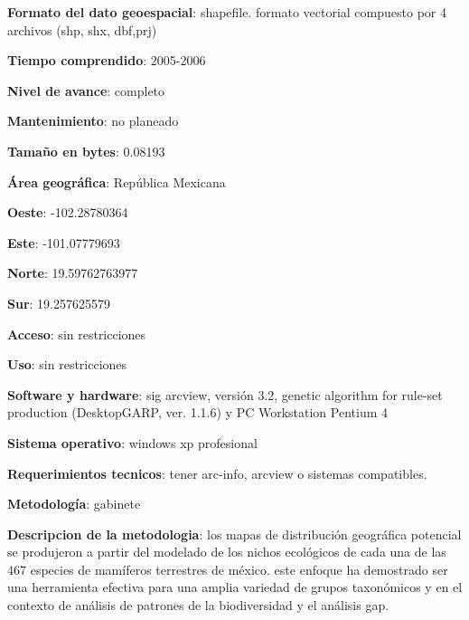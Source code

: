 \documentclass[twoside]{book}
\begin{document}
{\textbf{Formato del dato geoespacial}: shapefile. formato vectorial compuesto por 4 archivos (shp, shx, dbf,prj)

\textbf{Tiempo comprendido}: 2005-2006

\textbf{Nivel de avance}: completo

\textbf{Mantenimiento}: no planeado

\textbf{Tamaño en bytes}: 0.08193


\textbf{Área geográfica}: República Mexicana


\textbf{Oeste}: -102.28780364

\textbf{Este}: -101.07779693

\textbf{Norte}: 19.59762763977

\textbf{Sur}: 19.257625579


\textbf{Acceso}: sin restricciones

\textbf{Uso}: sin restricciones


\textbf{Software y hardware}: sig arcview, versión 3.2, genetic algorithm for rule-set production
(DesktopGARP, ver. 1.1.6) y PC Workstation Pentium 4

\textbf{Sistema operativo}: windows xp profesional

\textbf{Requerimientos tecnicos}: tener arc-info, arcview o sistemas compatibles.


\textbf{Metodología}: gabinete

\textbf{Descripcion de la metodologia}: los mapas de distribución geográfica potencial se produjeron a partir del modelado de los nichos ecológicos de cada una de las 467 especies de mamíferos terrestres de méxico. este enfoque ha demostrado ser una herramienta efectiva para una amplia variedad de grupos taxonómicos y en el contexto de análisis de patrones de la biodiversidad y el análisis gap.

}
\end{document}
